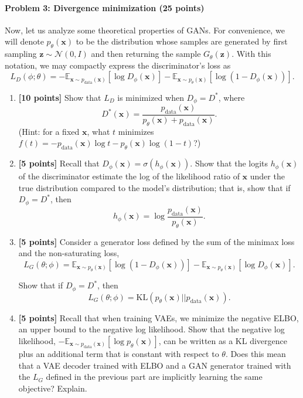 \documentclass{article}
\newcommand{\bx}{{\boldsymbol{x}}}
\newcommand{\bz}{{\boldsymbol{z}}}
\begin{document}
\paragraph{Problem 3: Divergence minimization (25 points)\\}

Now, let us analyze some theoretical properties of GANs. For convenience, we will denote $p_\theta(\bx)$ to be the distribution whose samples are generated by first sampling $\bz \sim \mathcal{N}(0, I)$ and then returning the sample $G_\theta(\bz)$. With this notation, we may compactly express the discriminator's loss as \[
 L_D(\phi; \theta) = -\mathbb{E}_{\bx\sim p_\text{data}(\bx)} [ \log D_\phi(\bx) ] - \mathbb{E}_{\bx \sim p_\theta(\bx)} [\log(1 - D_\phi(\bx))].
\]
 
\begin{enumerate}
    \item \textbf{[10 points]} Show that $L_D$ is minimized when $D_\phi = D^*$, where \[
        D^*(\bx) = \frac{p_\text{data}(\bx)}{p_\theta(\bx) + p_\text{data}(\bx)}.
    \] (Hint: for a fixed $\bx$, what $t$ minimizes $f(t) = -p_\text{data}(\bx) \log t - p_\theta(\bx) \log (1 - t) $?)
    
    \item \textbf{[5 points]} Recall that $D_\phi(\bx) = \sigma(h_\phi(\bx))$. Show that the logits $h_\phi(\bx)$ of the discriminator estimate the log of the likelihood ratio of $\bx$ under the true distribution compared to the model's distribution; that is, show that if $D_\phi = D^*$, then \[
        h_\phi(\bx) = \log \frac{p_\text{data}(\bx)}{p_\theta(\bx)}.
    \]
    
    \item \textbf{[5 points]} Consider a generator loss defined by the sum of the minimax loss and the non-saturating loss, \[
        L_G(\theta; \phi) = \mathbb{E}_{\bx \sim p_\theta(\bx)} [ \log (1 - D_\phi(\bx)) ] -\mathbb{E}_{\bx \sim p_\theta(\bx)} [ \log D_\phi(\bx) ] .
    \]
    
    Show that if $D_\phi = D^*$, then \[
        L_G(\theta; \phi) = \textrm{KL}(p_\theta(\bx) || p_\text{data}(\bx)).
    \]
    
    \item \textbf{[5 points]} Recall that when training VAEs, we minimize the negative ELBO, an upper bound to the negative log likelihood. Show that the negative log likelihood, $-\mathbb{E}_{\bx \sim p_\text{data}(\bx)} [\log p_\theta(\bx)]$, can be written as a KL divergence plus an additional term that is constant with respect to $\theta$. Does this mean that a VAE decoder trained with ELBO and a GAN generator trained with the $L_G$ defined in the previous part are implicitly learning the same objective? Explain.
\end{enumerate}
\end{document}
